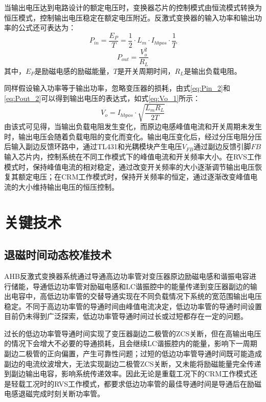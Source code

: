 当输出电压达到电路设计的额定电压时，变换器芯片的控制模式由恒流模式转换为恒压模式，控制输出电压稳定在额定电压附近。反激式变换器的输入功率和输出功率的公式还可表达为：
\begin{equation}
    \label{eq:Pin_2}
    P_{in} = \frac{E_P}{T}=\frac{1}{2} \cdot L_m \cdot I_{hbpos} \cdot \frac{1}{T}
\end{equation}
\begin{equation}
    \label{eq:Pout_2}
    P_{out} = \frac{V_o^2}{R_L} 
\end{equation}
其中，$E_P$是励磁电感的励磁能量，$T$是开关周期时间，$R_L$是输出负载电阻。

同样假设输入功率等于输出功率，忽略变压器的损耗，由式\eqref{eq:Pin_2}和\eqref{eq:Pout_2}可以得到输出电压的表达式，如式\eqref{eq:Vo_1}所示：
\begin{equation}
    \label{eq:Vo_1}
    V_o = I_{hbpos} \cdot \sqrt{\frac{L_m R_L}{2T}}
\end{equation}
由该式可见得，当输出负载电阻发生变化，而原边电感峰值电流和开关周期未发生时，输出电压会随着负载电阻的变化而变化。输出电压变化后，经过分压电阻分压后输入副边反馈环路中，通过TL431和光耦模块产生电压$V_{FB}$通过副边反馈引脚$FB$输入芯片内，控制系统在不同工作模式下的峰值电流和开关频率大小。在RVS工作模式时，保持峰值电流的相对稳定，通过改变开关频率的大小逐渐调节输出电压恢复其额定电压；在CRM工作模式时，保持开关频率的恒定，通过逐渐改变峰值电流的大小维持输出电压的恒压控制。


\section{关键技术}

\subsection{退磁时间动态校准技术}

AHB反激式变换器系统通过导通高边功率管对变压器原边励磁电感和谐振电容进行储能，导通低边功率管对励磁电感和LC谐振腔中的能量传递到变压器副边的输出电容中，高低边功率管的交替导通实现在不同负载情况下系统的宽范围输出电压稳定。不同于高边功率管的导通时间由峰值电流决定，低边功率管的导通时间设置目前仍未得到广泛探索，低边功率管导通时间过长或过短都存在一定的问题。

过长的低边功率管导通时间实现了变压器副边二极管的ZCS关断，但在高输出电压的情况下会增大不必要的导通损耗，且会继续LC谐振腔内的能量，影响下一周期副边二极管的正向偏置，产生可靠性问题；过短的低边功率管导通时间既可能造成副边的电流纹波增大，无法实现副边二极管ZCS关断，又未能将励磁能量完全传递到副边输出电容，影响系统传递效率。因此无论是重载工况下的CRM工作模式还是轻载工况时的RVS工作模式，都要求低边功率管的最佳导通时间是导通后在励磁电感退磁完成时刻关断功率管。

